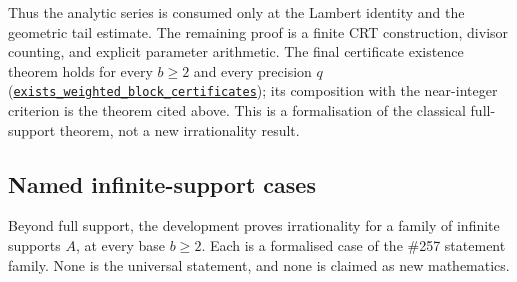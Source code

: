 \documentclass[11pt]{article}
\newcommand{\commit}{81150c1c6fdd4cd51e76d3aa0de344341e0e9e7c}
\newcommand{\repobase}{https://github.com/wcook04/plectis-lean-erdos249-257/blob/\commit}
\newcommand{\PK}{Erdos249257}
\newcommand{\lrefx}[3]{\href{\repobase/\PK/#1\#L#2}{\nolinkurl{#3}}}
\theoremstyle{definition}
\theoremstyle{remark}
\begin{document}
Thus the analytic series is consumed only at the Lambert identity and the
geometric tail estimate.  The remaining proof is a finite CRT construction,
divisor counting, and explicit parameter arithmetic.  The final certificate
existence theorem holds for every $b\geq2$ and every precision $q$
(\lrefx{CertificateKernel.lean}{7859}{exists_weighted_block_certificates}); its
composition with the near-integer criterion is the theorem cited above.  This
is a formalisation of the classical full-support theorem, not a new
irrationality result.

\subsection{Named infinite-support cases}

Beyond full support, the development proves irrationality for a family of infinite
supports $A$, at every base $b\ge2$. Each is a formalised case of the \#257
statement family. None is the universal statement, and none is claimed as new
mathematics.
\end{document}
